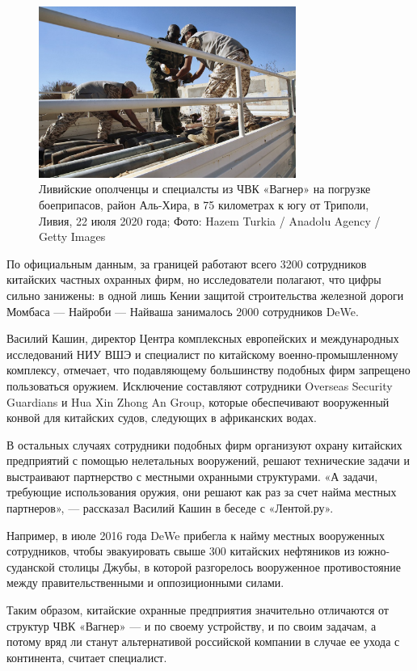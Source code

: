 \begin{figure}[h]
    \centering
    \includegraphics[width=0.75\textwidth]{img/pmc_africa_6.jpg}
    \caption{Ливийские ополченцы и специалсты из ЧВК «Вагнер» на погрузке боеприпасов, район Аль-Хира, в 75 километрах к югу от Триполи, Ливия, 22 июля 2020 года; Фото: Hazem Turkia / Anadolu Agency / Getty Images}
\end{figure}

По официальным данным, за границей работают всего 3200 сотрудников китайских частных охранных фирм, но исследователи полагают, что цифры сильно занижены: в одной лишь Кении защитой строительства железной дороги Момбаса — Найроби — Найваша занималось 2000 сотрудников DeWe.

Василий Кашин, директор Центра комплексных европейских и международных исследований НИУ ВШЭ и специалист по китайскому военно-промышленному комплексу, отмечает, что подавляющему большинству подобных фирм запрещено пользоваться оружием. Исключение составляют сотрудники Overseas Security Guardians и Hua Xin Zhong An Group, которые обеспечивают вооруженный конвой для китайских судов, следующих в африканских водах.

В остальных случаях сотрудники подобных фирм организуют охрану китайских предприятий с помощью нелетальных вооружений, решают технические задачи и выстраивают партнерство с местными охранными структурами. «А задачи, требующие использования оружия, они решают как раз за счет найма местных партнеров», — рассказал Василий Кашин в беседе с «Лентой.ру».

Например, в июле 2016 года DeWe прибегла к найму местных вооруженных сотрудников, чтобы эвакуировать свыше 300 китайских нефтяников из южно-суданской столицы Джубы, в которой разгорелось вооруженное противостояние между правительственными и оппозиционными силами.

Таким образом, китайские охранные предприятия значительно отличаются от структур ЧВК «Вагнер» — и по своему устройству, и по своим задачам, а потому вряд ли станут альтернативой российской компании в случае ее ухода с континента, считает специалист.

